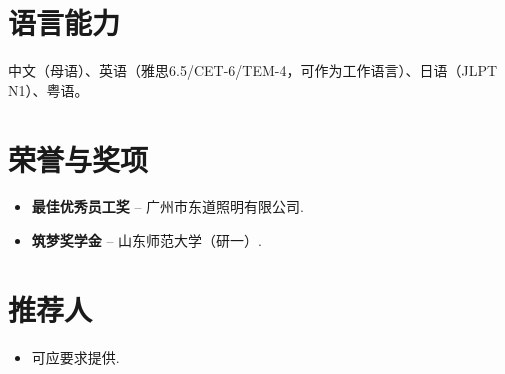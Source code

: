 \documentclass[11pt,a4paper,sans]{moderncv}
\begin{document}

\section{语言能力}
\vspace{1pt}

中文（母语）、英语（雅思6.5/CET-6/TEM-4，可作为工作语言）、日语（JLPT N1）、粤语。


\section{荣誉与奖项}
\vspace{1pt}
\begin{itemize}
\item{\textbf{最佳优秀员工奖} -- 广州市东道照明有限公司.}
\item{\textbf{筑梦奖学金} -- 山东师范大学（研一）.}
\end{itemize}


\section{推荐人}
\vspace{1pt}
\begin{itemize}
\item{可应要求提供.}
\end{itemize}
\end{document}
